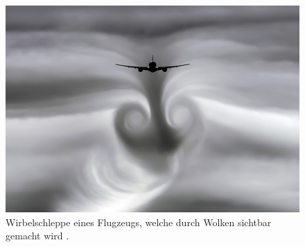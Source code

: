 \begin{figure}
\centering
\includegraphics[width=\textwidth]{papers/wirbelringe/fig/wirbelschleppe_in_wolken.jpeg}
\caption{Wirbelschleppe eines Flugzeugs, welche durch Wolken sichtbar gemacht
wird \cite{Wirbelringe:Wirbelschleppe_in_Wolken}.
\label{Wirbelringe:fig:Wirbelschleppe_in_wolken}}
\end{figure}
